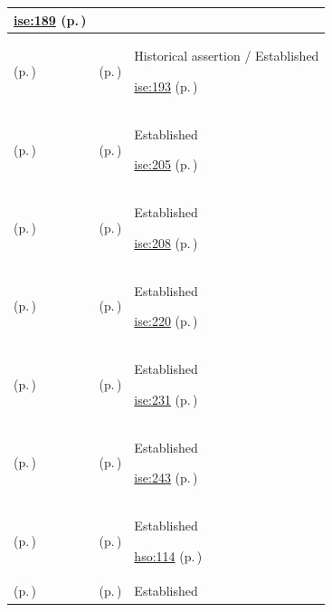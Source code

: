 \begin{longtable}{|>{\raggedright\arraybackslash}p{0.27\TableWidth}|>{\raggedright\arraybackslash}p{0.27\TableWidth}|>{\raggedright\arraybackslash}p{0.46\TableWidth}|}
 \hyperref[rad:ise:171]{ise:189} (p.\,\pageref{rad:ise:171})\\\hline
\nameref{function:supervise-activity-timeout-escalation} (p.\,\pageref{function:supervise-activity-timeout-escalation}) & \nameref{feature:feat-ise-23} (p.\,\pageref{feature:feat-ise-23}) & Historical assertion / Established

 \hyperref[rad:ise:171]{ise:193} (p.\,\pageref{rad:ise:171})\\\hline
\nameref{function:project-operational-schedule} (p.\,\pageref{function:project-operational-schedule}) & \nameref{feature:feat-ise-24} (p.\,\pageref{feature:feat-ise-24}) & Established

 \hyperref[rad:ise:200]{ise:205} (p.\,\pageref{rad:ise:200})\\\hline
\nameref{function:correlate-activity-with-temporal-context} (p.\,\pageref{function:correlate-activity-with-temporal-context}) & \nameref{feature:feat-ise-25} (p.\,\pageref{feature:feat-ise-25}) & Established

 \hyperref[rad:ise:200]{ise:208} (p.\,\pageref{rad:ise:200})\\\hline
\nameref{function:present-contextual-health-and-operational-information} (p.\,\pageref{function:present-contextual-health-and-operational-information}) & \nameref{feature:feat-ise-26} (p.\,\pageref{feature:feat-ise-26}) & Established

 \hyperref[rad:ise:215]{ise:220} (p.\,\pageref{rad:ise:215})\\\hline
\nameref{function:govern-information-semantics} (p.\,\pageref{function:govern-information-semantics}) & \nameref{feature:feat-ise-27} (p.\,\pageref{feature:feat-ise-27}) & Established

 \hyperref[rad:ise:227]{ise:231} (p.\,\pageref{rad:ise:227})\\\hline
\nameref{function:verify-semantic-conformance} (p.\,\pageref{function:verify-semantic-conformance}) & \nameref{feature:feat-ise-28} (p.\,\pageref{feature:feat-ise-28}) & Established

 \hyperref[rad:ise:227]{ise:243} (p.\,\pageref{rad:ise:227})\\\hline
\nameref{function:manage-theatre-case-progression} (p.\,\pageref{function:manage-theatre-case-progression}) & \nameref{feature:feat-hso-06} (p.\,\pageref{feature:feat-hso-06}) & Established

 \hyperref[rad:hso:106]{hso:114} (p.\,\pageref{rad:hso:106})\\\hline
\nameref{function:coordinate-ed-departmental-capacity} (p.\,\pageref{function:coordinate-ed-departmental-capacity}) & \nameref{feature:feat-hso-07} (p.\,\pageref{feature:feat-hso-07}) & Established


\end{longtable}
